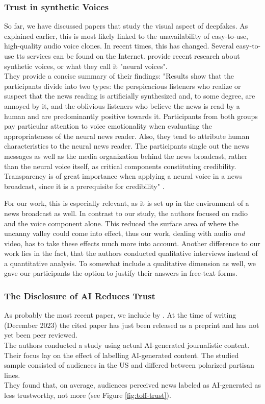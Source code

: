 \documentclass[
  a4paper,  %
  twoside,  %
  bibliography=totoc,
  headsepline,
  cleardoublepage=empty,
  parskip=half,
  draft=false
]{scrbook}
\begin{document}
\subsubsection*{Trust in synthetic Voices}
So far, we have discussed papers that study the visual aspect of deepfakes. As explained earlier, this is most likely linked to the unavailability of easy-to-use, high-quality audio voice clones. In recent times, this has changed. Several easy-to-use \gls{tts} services can be found on the Internet.  provide recent research about synthetic voices, or what they call it "neural voices". \\
They provide a concise summary of their findings: "Results show that the participants divide into two types: the perspicacious listeners who realize or suspect that the news reading is artificially synthesized and, to some degree, are annoyed by it, and the oblivious listeners who believe the news is read by a human and are predominantly positive towards it. Participants from both groups pay particular attention to voice emotionality when evaluating the appropriateness of the neural news reader. Also, they tend to attribute human characteristics to the neural news reader. The participants single out the news messages as well as the media organization behind the news broadcast, rather than the neural voice itself, as critical components constituting credibility. Transparency is of great importance when applying a neural voice in a news broadcast, since it is a prerequisite for credibility" \cite{heiselbergAutomatedNewsReading2022}.

For our work, this is especially relevant, as it is set up in the environment of a news broadcast as well. In contrast to our study, the authors focused on radio and the voice component alone. This reduced the surface area of where the uncanny valley could come into effect, thus our work, dealing with audio \textit{and} video, has to take these effects much more into account. Another difference to our work lies in the fact, that the authors conducted qualitative interviews instead of a quantitative analysis. To somewhat include a qualitative dimension as well, we gave our participants the option to justify their answers in free-text forms. 

\subsubsection*{The Disclosure of AI Reduces Trust}
As probably the most recent paper, we include  by \citeauthor{toffTheyCouldJust2023}. At the time of writing (December 2023) the cited paper has just been released as a preprint and has not yet been peer reviewed. \\
The authors conducted a study using actual AI-generated journalistic content. Their focus lay on the effect of labelling AI-generated content. The studied sample consisted of audiences in the US and differed between polarized partisan lines. \\
They found that, on average, audiences perceived news labeled as AI-generated as less trustworthy, not more (see Figure \ref{fig:toff-trust}). 
\end{document}
